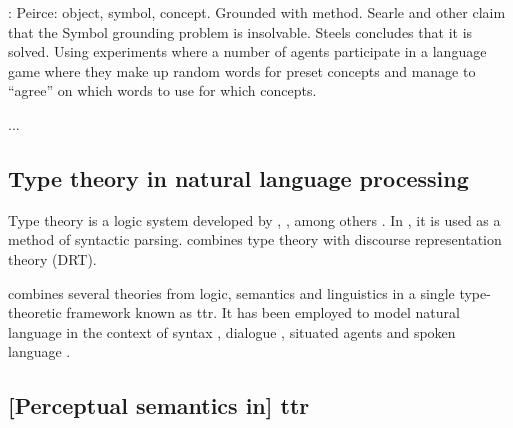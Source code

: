 \cite{SteelsSymbolGroundingProblem2007}:
Peirce: object, symbol, concept. Grounded with method.
Searle and other claim that the Symbol grounding problem is insolvable.
Steels concludes that it is solved.
Using experiments where a number of agents participate in a language game where they make up random words for preset concepts and manage to ``agree'' on which words to use for which concepts.

...



\subsection{Type theory in natural language processing}
\label{ssec:ttnlp}

Type theory is a logic system developed by \cite{WhiteheadPrincipiamathematica1910}, \cite{church40}, \cite{martinlof84} among others \citep{CoquandTypeTheory2015}.
In \cite{RantaTypetheoreticalGrammar1995}, it is used as a method of syntactic parsing.
\cite{KohlhaseTypeTheoreticSemanticslDRT1996} combines type theory with discourse representation theory (DRT).

\cite{CooperRecordsRecordTypes2005} combines several theories from logic, semantics and linguistics in a single type-theoretic framework known as \acrfull{ttr}.
It has been employed to model natural language in the context of
syntax \citep{CooperRecordsRecordTypes2005,RobinCooperAustiniantruthattitudes2005, CooperTypetheorysemantics2012, CooperTypetheorylanguage2016},
dialogue \citep{Larssonformalviewcorrective2009, CooperTypetheorylanguage2016, LarssonDialoguesHaveContent2011},
situated agents \citep{DobnikModellinglanguageaction2012, ttrspat,lspc} and
spoken language \citep{CooperTypetheorylanguage2016}.







\subsection{[Perceptual semantics in] \acrfull{ttr}}


